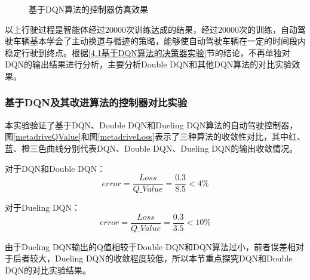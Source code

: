 \begin{figure}[htbp]
{    }
    \caption{基于DQN算法的控制器仿真效果}\label{基于DQN算法的控制器仿真效果} 
\end{figure}

以上行驶过程是智能体经过20000次训练达成的结果，经过20000次的训练，自动驾驶车辆基本学会了主动换道与循迹的策略，能够使自动驾驶车辆在一定的时间段内稳定行驶到终点。根据\ref{4.1基于DQN算法的决策器实验}节的结论，不再单独对DQN的输出结果进行分析，主要分析Double DQN和其他DQN算法的对比实验效果。

\subsubsection{基于DQN及其改进算法的控制器对比实验}

本实验验证了基于DQN、Double DQN和Dueling DQN算法的自动驾驶控制器，图\ref{metadriveQValue}和图\ref{metadriveLoss}表示了三种算法的收敛性对比，其中红、蓝、橙三色曲线分别代表DQN、Double DQN、Dueling DQN的输出收敛情况。

对于DQN和Double DQN：
\begin{equation}
    error = \frac{Loss}{Q\_Value} = \frac{0.3}{8.5} < 4\%
\end{equation}\label{dqn-controller-error}

对于Dueling DQN：
\begin{equation}
    error = \frac{Loss}{Q\_Value} = \frac{0.3}{3.5} < 10\%
\end{equation}\label{dueldqn-controller-error}

由于Dueling DQN输出的Q值相较于Double DQN和DQN算法过小，前者误差相对于后者较大，Dueling DQN的收敛程度较低，所以本节重点探究DQN和Double DQN的对比实验结果。

